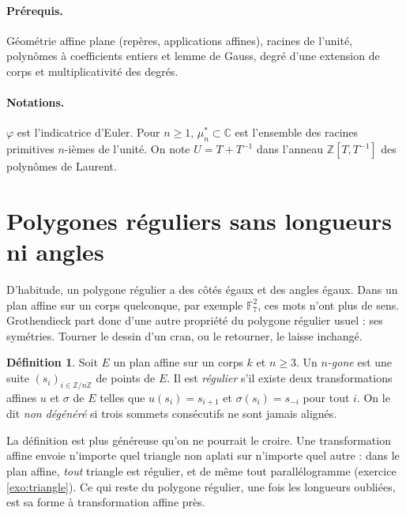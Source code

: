 \documentclass[11pt,a4paper]{article}
\theoremstyle{plain}
\theoremstyle{definition}
\newtheorem{definition}[theoreme]{Définition}
\theoremstyle{remark}
\newcommand{\Z}{\mathbb{Z}}
\newcommand{\C}{\mathbb{C}}
\newcommand{\F}{\mathbb{F}}
\begin{document}
\paragraph{Prérequis.} Géométrie affine plane (repères, applications affines), racines de l'unité, polynômes à coefficients entiers et lemme de Gauss, degré d'une extension de corps et multiplicativité des degrés.

\paragraph{Notations.} $\varphi$ est l'indicatrice d'Euler. Pour $n\geq1$, $\mu_n^*\subset\C$ est l'ensemble des racines primitives $n$-ièmes de l'unité. On note $U=T+T^{-1}$ dans l'anneau $\Z[T,T^{-1}]$ des polynômes de Laurent.

\tableofcontents

\section{Polygones réguliers sans longueurs ni angles}

D'habitude, un polygone régulier a des côtés égaux et des angles égaux. Dans un plan affine sur un corps quelconque, par exemple $\F_7^2$, ces mots n'ont plus de sens. Grothendieck part donc d'une autre propriété du polygone régulier usuel : ses symétries. Tourner le dessin d'un cran, ou le retourner, le laisse inchangé.

\begin{definition}\label{def:regulier}
Soit $E$ un plan affine sur un corps $k$ et $n\geq3$. Un \emph{$n$-gone} est une suite $(s_i)_{i\in\Z/n\Z}$ de points de $E$. Il est \emph{régulier} s'il existe deux transformations affines $u$ et $\sigma$ de $E$ telles que $u(s_i)=s_{i+1}$ et $\sigma(s_i)=s_{-i}$ pour tout $i$. On le dit \emph{non dégénéré} si trois sommets consécutifs ne sont jamais alignés.
\end{definition}

La définition est plus généreuse qu'on ne pourrait le croire. Une transformation affine envoie n'importe quel triangle non aplati sur n'importe quel autre : dans le plan affine, \emph{tout} triangle est régulier, et de même tout parallélogramme (exercice \ref{exo:triangle}). Ce qui reste du polygone régulier, une fois les longueurs oubliées, est sa forme à transformation affine près.
\end{document}
